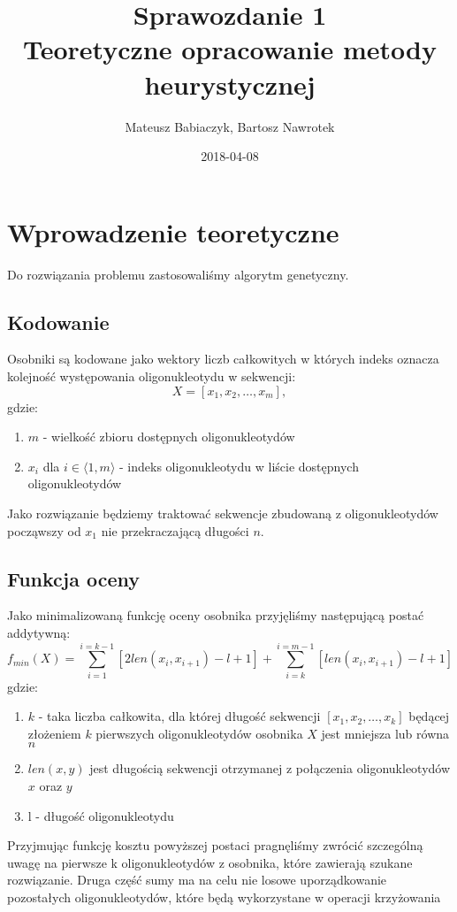 \documentclass{article}
\title{Sprawozdanie 1 \\ Teoretyczne opracowanie metody heurystycznej}
\date{2018-04-08}
\author{Mateusz Babiaczyk, Bartosz Nawrotek}
\begin{document}
\maketitle
\section{Wprowadzenie teoretyczne}
Do rozwiązania problemu zastosowaliśmy algorytm genetyczny.
\subsection{Kodowanie}
Osobniki są kodowane jako wektory liczb całkowitych w których indeks oznacza kolejność występowania oligonukleotydu w sekwencji:
\begin{equation}
	X = [ x_{1}, x_{2}, \ldots , x_{m}] , 
\end{equation}
gdzie:
\begin{enumerate}
	\item $m$ - wielkość zbioru dostępnych oligonukleotydów
	\item $x_{i}$ dla $i \in \langle1, m\rangle$ - indeks oligonukleotydu w liście dostępnych oligonukleotydów
\end{enumerate}
Jako rozwiązanie będziemy traktować sekwencje zbudowaną z oligonukleotydów począwszy od $x_{1}$ nie przekraczającą długości $n$.
\subsection{Funkcja oceny}
Jako minimalizowaną funkcję oceny osobnika przyjęliśmy następującą postać addytywną:
\begin{equation}
	f_{min}(X) = \sum_{i = 1}^{i = k - 1}{[2len(x_{i}, x_{i+1}) - l + 1]} + \sum_{i = k}^{i = m - 1}{[len(x_{i}, x_{i+1})- l + 1]}
\end{equation}
gdzie:
\begin{enumerate}
	\item $k$ - taka liczba całkowita, dla której długość sekwencji $[x_{1}, x_{2}, \ldots , x_{k}]$ będącej złożeniem $k$ pierwszych oligonukleotydów osobnika $X$ jest mniejsza lub równa $n$
	\item $len(x, y)$ jest długością sekwencji otrzymanej z połączenia oligonukleotydów $x$ oraz $y$
	\item l - długość oligonukleotydu
\end{enumerate}
Przyjmując funkcję kosztu powyższej postaci pragnęliśmy zwrócić szczególną uwagę na pierwsze k oligonukleotydów z osobnika, które zawierają szukane rozwiązanie. Druga część sumy ma na celu nie losowe uporządkowanie pozostałych oligonukleotydów, które będą wykorzystane w operacji krzyżowania
\end{document}
